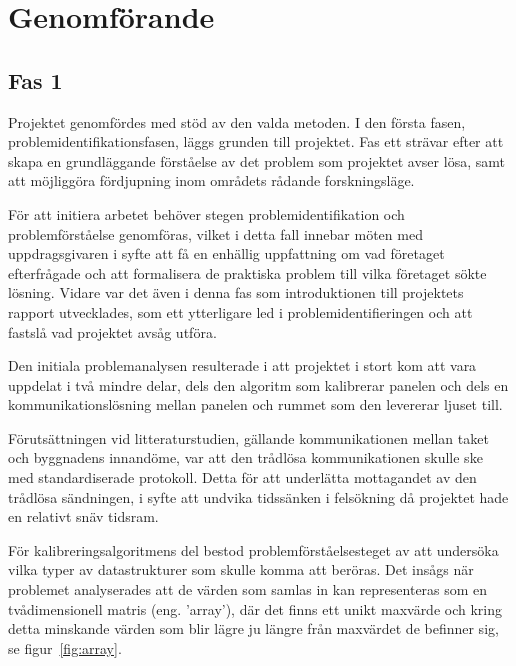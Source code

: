 \section{Genomförande} %
\label{sec:genomf_rande}
    \subsection{Fas 1} %
    \label{sub:steg_1}
        Projektet genomfördes med stöd av den valda metoden. I den första fasen, problemidentifikationsfasen, läggs grunden till projektet. Fas ett strävar efter att skapa en grundläggande förståelse av det problem som projektet avser lösa, samt att möjliggöra fördjupning inom områdets rådande forskningsläge.\bigskip

        För att initiera arbetet behöver stegen problemidentifikation och problemförståelse genomföras, vilket i detta fall innebar möten med uppdragsgivaren i syfte att få en enhällig uppfattning om vad företaget efterfrågade och att formalisera de praktiska problem till vilka företaget sökte lösning. Vidare var det även i denna fas som introduktionen till projektets rapport utvecklades, som ett ytterligare led i problemidentifieringen och att fastslå vad projektet avsåg utföra. \bigskip

        Den initiala problemanalysen resulterade i att projektet i stort kom att vara uppdelat i två mindre delar, dels den algoritm som kalibrerar panelen och dels en kommunikationslösning mellan panelen och rummet som den levererar ljuset till. \bigskip

        Förutsättningen vid litteraturstudien, gällande kommunikationen mellan taket och byggnadens innandöme, var att den trådlösa kommunikationen skulle ske med standardiserade protokoll. Detta för att underlätta mottagandet av den trådlösa sändningen, i syfte att undvika tidssänken i felsökning då projektet hade en relativt snäv tidsram.\bigskip

        För kalibreringsalgoritmens del bestod problemförståelsesteget av att undersöka vilka typer av datastrukturer som skulle komma att beröras. Det insågs när problemet analyserades att de värden som samlas in kan representeras som en tvådimensionell matris (eng. 'array'), där det finns ett unikt maxvärde och kring detta minskande värden som blir lägre ju längre från maxvärdet de befinner sig, se figur~\ref{fig:array}. \bigskip

